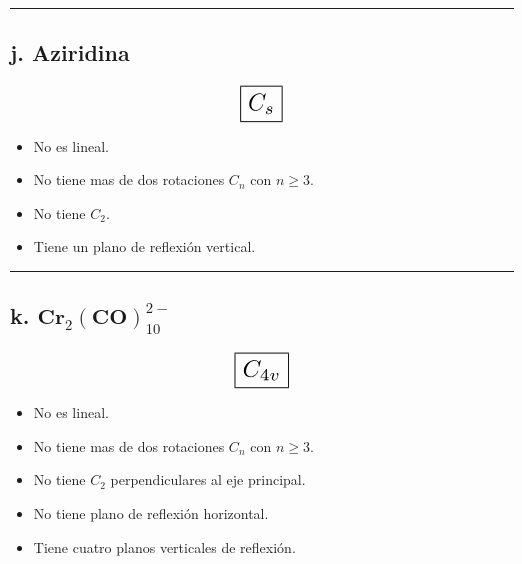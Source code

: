 \iffalse
No es lineal.
No tiene mas de dos rotaciones $C_n$ con $n \geq 3$.
Tiene un $C_2$.
No tiene rotaciones $C_2$ perpendiculares al eje principal.
No tiene plano de reflexión horizontal $\sigma h$.
No tiene planos de reflexión verticales.
No es $S_{2n}$ con $n=2$.

C_2
\fi

\begin{center}
    \rule{15cm}{0.4pt}
\end{center}


\subsection*{j. Aziridina}

\[ \scalebox{1.7}{$\boxed{C_s}$} \]

\begin{itemize}
    \item No es lineal.
    \item No tiene mas de dos rotaciones $C_n$ con $n \geq 3$.
    \item No tiene $C_2$.
    \item Tiene un plano de reflexión vertical.
\end{itemize}

\iffalse
No es lineal.
No tiene mas de dos rotaciones $C_n$ con $n \geq 3$.
No tiene $C_2$.
Tiene un plano de reflexión vertical.

C_s
\fi

\begin{center}
    \rule{15cm}{0.4pt}
\end{center}


\subsection*{k. $\textbf{Cr}_2\left(\textbf{CO}\right)^{2-}_{10}$}

\[ \scalebox{1.7}{$\boxed{C_{4v}}$} \]

\begin{itemize}
    \item No es lineal.
    \item No tiene mas de dos rotaciones $C_n$ con $n \geq 3$.
    \item No tiene $C_2$ perpendiculares al eje principal.
    \item No tiene plano de reflexión horizontal.
    \item Tiene cuatro planos verticales de reflexión.
\end{itemize}

